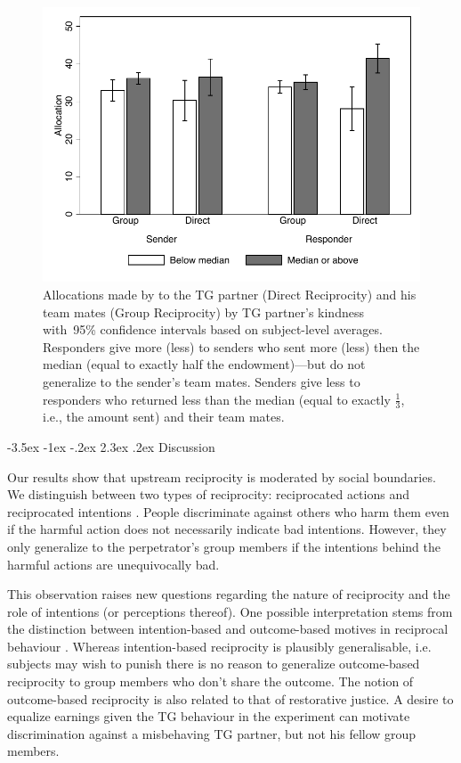 \documentclass[12pt,a4paper]{article}
\makeatletter
\renewcommand\section{\@startsection {section}{1}{\z@}%
{-3.5ex \@plus -1ex \@minus -.2ex}%
{2.3ex \@plus.2ex}%
{\bf\sffamily\Large}}
\def\figwidth{\textwidth}
\makeatother
\begin{document}
\begin{figure}
\begin{center}	
\caption{
Allocations made by to the TG partner (Direct Reciprocity) and his team mates (Group Reciprocity) by TG partner's kindness with~95\% confidence intervals based on subject-level averages. Responders give
more (less) to senders who sent more (less) then the median (equal to exactly half the endowment)---but do not generalize to the sender's team mates. Senders give less to responders who returned less than
the median (equal to exactly $\frac{1}{3}$, i.e., the amount sent) and their team mates.
}
\label{fig:reciprocity}
\includegraphics[width=\figwidth]{Reciprocity.pdf}
\end{center}
\end{figure}

\section{Discussion}
\label{sec:conclusion}

Our results show that upstream reciprocity is moderated by social
boundaries. We distinguish between two types of reciprocity: reciprocated
actions and reciprocated intentions \citep{stanca2009testing}. People
discriminate against others who harm them even if the harmful action
does not necessarily indicate bad intentions. However, they only generalize
to the perpetrator's  group members if the intentions behind the harmful
actions are unequivocally bad. 

This observation raises new questions regarding the nature of reciprocity
and the role of intentions (or perceptions thereof). One possible
interpretation stems from the distinction between intention-based
and outcome-based motives in reciprocal behaviour \citep{falk2006theory}.
Whereas intention-based reciprocity is plausibly generalisable, i.e.
subjects may wish to punish there is no reason to generalize outcome-based
reciprocity to group members who don't share the outcome. The notion
of outcome-based reciprocity is also related to that of restorative
justice. A desire to equalize earnings given the TG behaviour in the
experiment can motivate discrimination against a misbehaving TG partner,
but not his fellow group members.
\end{document}
